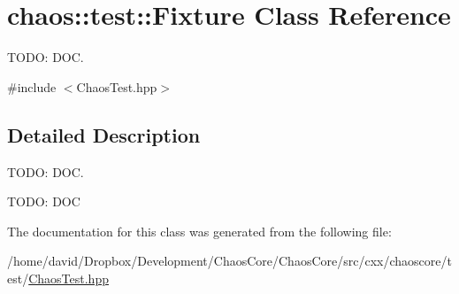 \hypertarget{classchaos_1_1test_1_1_fixture}{\section{chaos\-:\-:test\-:\-:Fixture Class Reference}
\label{classchaos_1_1test_1_1_fixture}
}


T\-O\-D\-O\-: D\-O\-C.  




{\ttfamily \#include $<$Chaos\-Test.\-hpp$>$}



\subsection{Detailed Description}
T\-O\-D\-O\-: D\-O\-C. 

T\-O\-D\-O\-: D\-O\-C 

The documentation for this class was generated from the following file\-:\begin{DoxyCompactItemize}
\item 
/home/david/\-Dropbox/\-Development/\-Chaos\-Core/\-Chaos\-Core/src/cxx/chaoscore/test/\hyperlink{_chaos_test_8hpp}{Chaos\-Test.\-hpp}\end{DoxyCompactItemize}
